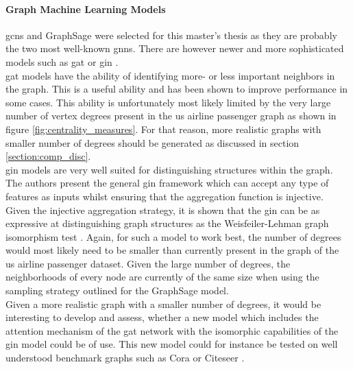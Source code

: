   \paragraph{Graph Machine Learning Models}\mbox{}

  \noindent \acsp{gcn} and GraphSage were selected for this master's thesis as 
  they are probably the two most well-known \acsp{gnn}. There are however 
  newer and more sophisticated models such as \ac{gat} \citep{velivckovic2018graph} 
  or \ac{gin} \citep{xu2019powerful}. \\

  \noindent \acs{gat} models have the ability of identifying more- or less 
  important neighbors in the graph. This is a useful ability and has been shown 
  to improve performance in some cases. This ability is unfortunately most likely 
  limited by the very large number of vertex degrees present in the \acs{us} 
  airline passenger graph as shown in figure \ref{fig:centrality_measures}. For 
  that reason, more realistic graphs with smaller number of degrees should be
  generated as discussed in section \ref{section:comp_disc}. \\

  \noindent \acs{gin} models are very well suited for distinguishing structures 
  within the graph. The authors \cite{xu2019powerful} present the general
  \acs{gin} framework which can accept any type of features as inputs whilst 
  ensuring that the aggregation function is injective. Given the injective 
  aggregation strategy, it is shown that the \acs{gin} can be as expressive at 
  distinguishing graph structures as the Weisfeiler-Lehman graph isomorphism test 
  \citep{weisfeiler1968}. Again, for such a model to work best, the number of
  degrees would most likely need to be smaller than currently present in the
  graph of the \acs{us} airline passenger dataset. Given the large number of 
  degrees, the neighborhoods of every node are currently of the same size when 
  using the sampling strategy outlined for the GraphSage model. \\

  \noindent Given a more realistic graph with a smaller number of degrees, it
  would be interesting to develop and assess, whether a new model which
  includes the attention mechanism of the \acs{gat} network with the isomorphic 
  capabilities of the \acs{gin} model could be of use. This new model could for
  instance be tested on well understood benchmark graphs such as Cora
  \citep{mccallum2000automating} or Citeseer \citep{giles1998citeseer}. 

